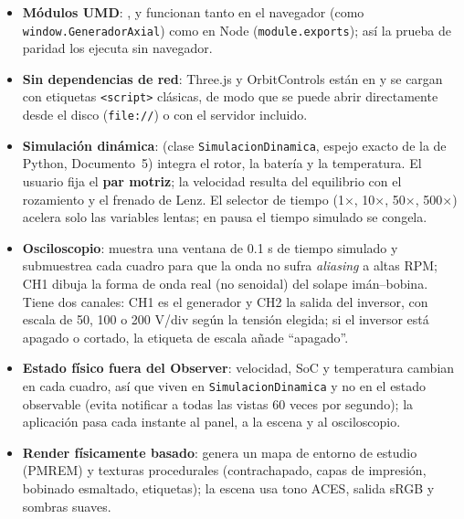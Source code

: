 \documentclass[11pt]{article}
\begin{document}
\begin{itemize}
  \item \textbf{Módulos UMD}: ,  y  funcionan tanto en el navegador
        (como \texttt{window.GeneradorAxial}) como en Node (\texttt{module.exports}); así la prueba de paridad
        los ejecuta sin navegador.
  \item \textbf{Sin dependencias de red}: Three.js y OrbitControls están en  y se cargan con
        etiquetas \texttt{<script>} clásicas, de modo que  se puede abrir directamente desde
        el disco (\texttt{file://}) o con el servidor incluido.
  \item \textbf{Simulación dinámica}:  (clase \texttt{SimulacionDinamica}, espejo exacto
        de la de Python, Documento~5) integra el rotor, la batería y la temperatura. El usuario fija el
        \textbf{par motriz}; la velocidad resulta del equilibrio con el rozamiento y el frenado de Lenz. El selector
        de tiempo (1×, 10×, 50×, 500×) acelera solo las variables lentas; en pausa el tiempo simulado se congela.
  \item \textbf{Osciloscopio}: muestra una ventana de 0.1 s de tiempo simulado y submuestrea cada cuadro para que
        la onda no sufra \emph{aliasing} a altas RPM; CH1 dibuja la forma de onda real (no senoidal) del solape
        imán–bobina. Tiene dos canales: CH1 es el generador y CH2 la
        salida del inversor, con escala de 50, 100 o 200 V/div según la tensión elegida; si el inversor está
        apagado o cortado, la etiqueta de escala añade ``apagado''.
  \item \textbf{Estado físico fuera del Observer}: velocidad, SoC y temperatura cambian en cada cuadro, así que viven
        en \texttt{SimulacionDinamica} y no en el estado observable (evita notificar a todas las vistas 60 veces por
        segundo); la aplicación pasa cada instante al panel, a la escena y al osciloscopio.
  \item \textbf{Render físicamente basado}:  genera un mapa de entorno de estudio (PMREM)
        y texturas procedurales (contrachapado, capas de impresión, bobinado esmaltado, etiquetas); la escena usa
        tono ACES, salida sRGB y sombras suaves.
\end{itemize}

\end{document}
